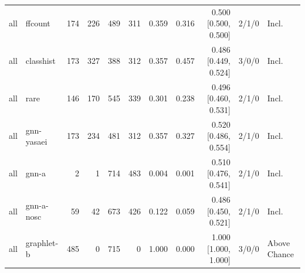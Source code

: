 \begin{tabular}{@{}llrrrrrrrll@{}}
all & ffcount & 174 & 226 & 489 & 311 & 0.359 & 0.316 & 0.500 [0.500, 0.500] & 2/1/0 & Incl. \\
all & classhist & 173 & 327 & 388 & 312 & 0.357 & 0.457 & 0.486 [0.449, 0.524] & 3/0/0 & Incl. \\
all & rare & 146 & 170 & 545 & 339 & 0.301 & 0.238 & 0.496 [0.460, 0.531] & 2/1/0 & Incl. \\
all & gnn-yasaei & 173 & 234 & 481 & 312 & 0.357 & 0.327 & 0.520 [0.486, 0.554] & 2/1/0 & Incl. \\
all & gnn-a & 2 & 1 & 714 & 483 & 0.004 & 0.001 & 0.510 [0.476, 0.541] & 2/1/0 & Incl. \\
all & gnn-a-nosc & 59 & 42 & 673 & 426 & 0.122 & 0.059 & 0.486 [0.450, 0.521] & 2/1/0 & Incl. \\
all & graphlet-b & 485 & 0 & 715 & 0 & 1.000 & 0.000 & 1.000 [1.000, 1.000] & 3/0/0 & Above Chance \\
\bottomrule
\end{tabular}
